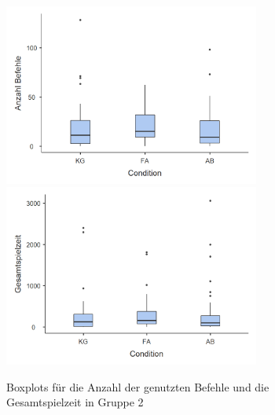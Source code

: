 \begin{figure}[htbp]
    \centering
    \includegraphics[width=0.75\textwidth]{img/boxplot/befehle_2_box_plot.png}
    \includegraphics[width=0.75\textwidth]{img/boxplot/zeit_2_box_plot.png}
    \caption{Boxplots für die Anzahl der genutzten Befehle und die Gesamtspielzeit in Gruppe 2}
\end{figure}